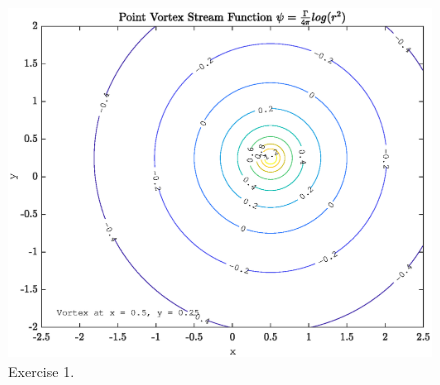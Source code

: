 \begin{figure}[h]
\centering
\includegraphics[scale=0.8]{untitled.eps}
\caption{Exercise 1.}
\label{foobar-figure}
\end{figure}